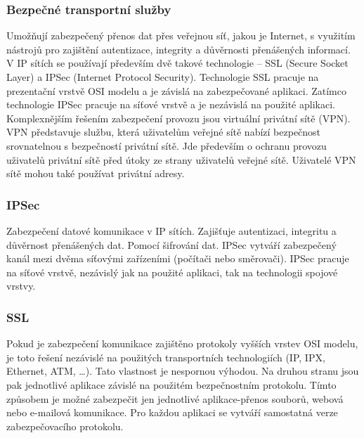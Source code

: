\subsubsection{Bezpečné transportní služby}
Umožňují zabezpečený přenos dat přes veřejnou síť, jakou je Internet, s využitím nástrojů pro zajištění autentizace, integrity a důvěrnosti přenášených informací.
V IP sítích se používají především dvě takové technologie – SSL (Secure Socket Layer) a IPSec (Internet Protocol Security). 
Technologie SSL pracuje na prezentační vrstvě OSI modelu a je závislá na zabezpečované aplikaci. Zatímco technologie IPSec pracuje na síťové vrstvě a je nezávislá na použité aplikaci. Komplexnějším řešením zabezpečení provozu jsou virtuální privátní sítě (VPN). VPN představuje službu, která uživatelům veřejné sítě nabízí bezpečnost srovnatelnou s bezpečností privátní sítě. Jde především o ochranu provozu uživatelů privátní sítě před útoky ze strany uživatelů veřejné sítě. Uživatelé VPN sítě mohou také používat privátní adresy.
\subsubsection{IPSec}
Zabezpečení datové komunikace v IP sítích. Zajišťuje autentizaci, integritu a důvěrnost přenášených dat. Pomocí šifrování dat. IPSec vytváří zabezpečený kanál mezi dvěma síťovými zařízeními (počítači nebo směrovači). IPSec pracuje na síťové vrstvě, nezávislý jak na použité aplikaci, tak na technologii spojové vrstvy.

\subsubsection{SSL}
Pokud je zabezpečení komunikace zajištěno protokoly vyšších vrstev OSI modelu, je toto řešení nezávislé na použitých transportních technologiích (IP, IPX, Ethernet, ATM, …). 
Tato vlastnost je nespornou výhodou. Na druhou stranu jsou pak jednotlivé aplikace závislé na použitém bezpečnostním protokolu.
Tímto způsobem je možné zabezpečit jen jednotlivé aplikace-přenos souborů, webová nebo e-mailová komunikace. Pro každou aplikaci se vytváří samostatná verze zabezpečovacího protokolu.

